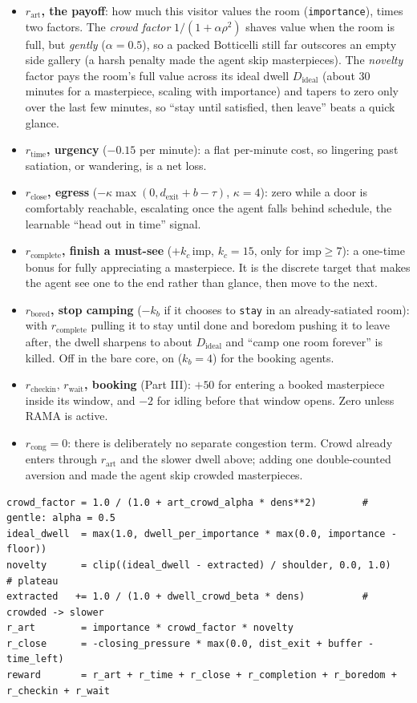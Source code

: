\documentclass[11pt]{article}
\newcommand{\co}[1]{\texttt{\small #1}}
\begin{document}
\begin{itemize}
\item \textbf{$r_{\text{art}}$, the payoff}: how much this visitor values the room (\co{importance}), times two factors. The \emph{crowd factor} $1/(1+\alpha\rho^2)$ shaves value when the room is full, but \emph{gently} ($\alpha=0.5$), so a packed Botticelli still far outscores an empty side gallery (a harsh penalty made the agent skip masterpieces). The \emph{novelty} factor pays the room's full value across its ideal dwell $D_{\text{ideal}}$ (about 30 minutes for a masterpiece, scaling with importance) and tapers to zero only over the last few minutes, so ``stay until satisfied, then leave'' beats a quick glance.
\item \textbf{$r_{\text{time}}$, urgency} ($-0.15$ per minute): a flat per-minute cost, so lingering past satiation, or wandering, is a net loss.
\item \textbf{$r_{\text{close}}$, egress} ($-\kappa\max(0,d_{\text{exit}}{+}b{-}\tau)$, $\kappa{=}4$): zero while a door is comfortably reachable, escalating once the agent falls behind schedule, the learnable ``head out in time'' signal.
\item \textbf{$r_{\text{complete}}$, finish a must-see} ($+k_c\,\mathrm{imp}$, $k_c{=}15$, only for $\mathrm{imp}\!\ge\!7$): a one-time bonus for fully appreciating a masterpiece. It is the discrete target that makes the agent see one to the end rather than glance, then move to the next.
\item \textbf{$r_{\text{bored}}$, stop camping} ($-k_b$ if it chooses to \co{stay} in an already-satiated room): with $r_{\text{complete}}$ pulling it to stay until done and boredom pushing it to leave after, the dwell sharpens to about $D_{\text{ideal}}$ and ``camp one room forever'' is killed. Off in the bare core, on ($k_b{=}4$) for the booking agents.
\item \textbf{$r_{\text{checkin}},\,r_{\text{wait}}$, booking} (Part III): $+50$ for entering a booked masterpiece inside its window, and $-2$ for idling before that window opens. Zero unless RAMA is active.
\item \textbf{$r_{\text{cong}}=0$}: there is deliberately no separate congestion term. Crowd already enters through $r_{\text{art}}$ and the slower dwell above; adding one double-counted aversion and made the agent skip crowded masterpieces.
\end{itemize}

\begin{lstlisting}
crowd_factor = 1.0 / (1.0 + art_crowd_alpha * dens**2)        # gentle: alpha = 0.5
ideal_dwell  = max(1.0, dwell_per_importance * max(0.0, importance - floor))
novelty      = clip((ideal_dwell - extracted) / shoulder, 0.0, 1.0)   # plateau
extracted   += 1.0 / (1.0 + dwell_crowd_beta * dens)          # crowded -> slower
r_art        = importance * crowd_factor * novelty
r_close      = -closing_pressure * max(0.0, dist_exit + buffer - time_left)
reward       = r_art + r_time + r_close + r_completion + r_boredom + r_checkin + r_wait
\end{lstlisting}
\end{document}
